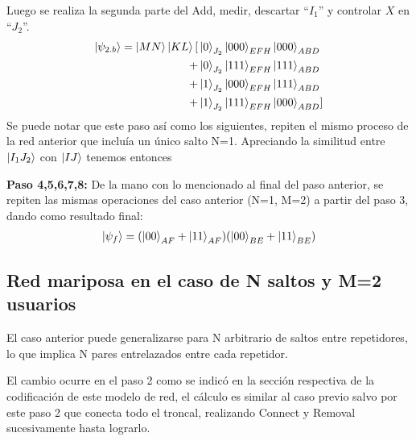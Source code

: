 Luego se realiza la segunda parte del Add, medir, descartar ``$I_1$'' y controlar $X$ en ``$J_2$''.
\begin{align*}
\ket{\psi_{2.b}} =  \ket{MN}\ket{KL} 
[ & \ket{0}_{J_2} \ket{000}_{EFH} \ket{000}_{ABD} \\
+ & \ket{0}_{J_2} \ket{111}_{EFH} \ket{111}_{ABD} \\
+ & \ket{1}_{J_2} \ket{000}_{EFH} \ket{111}_{ABD} \\
+ & \ket{1}_{J_2} \ket{111}_{EFH} \ket{000}_{ABD}]
\end{align*}
Se puede notar que este paso así como los siguientes, repiten el mismo proceso de la red anterior que incluía un único salto N=1. Apreciando la similitud entre $\ket{I_1 J_2}$ con $\ket{IJ}$ tenemos entonces \par \noindent
\textbf{Paso 4,5,6,7,8:} De la mano con lo mencionado al final del paso anterior, se repiten las mismas operaciones del caso anterior (N=1, M=2) a partir del paso 3,  dando como resultado final:
\begin{align*}
\ket{\psi_f} =  (\ket{00}_{AF}+\ket{11}_{AF})(\ket{00}_{BE}+\ket{11}_{BE})
\end{align*}

\subsection{Red mariposa en el caso de N saltos y M=2 usuarios}
El caso anterior puede generalizarse para N arbitrario de saltos entre repetidores, lo que implica N pares entrelazados entre cada repetidor. \par
El cambio ocurre en el paso 2 como se indicó en la sección respectiva de la codificación de este modelo de red, el cálculo es similar al caso previo salvo por este paso 2 que conecta todo el troncal, realizando Connect y Removal sucesivamente hasta lograrlo.
